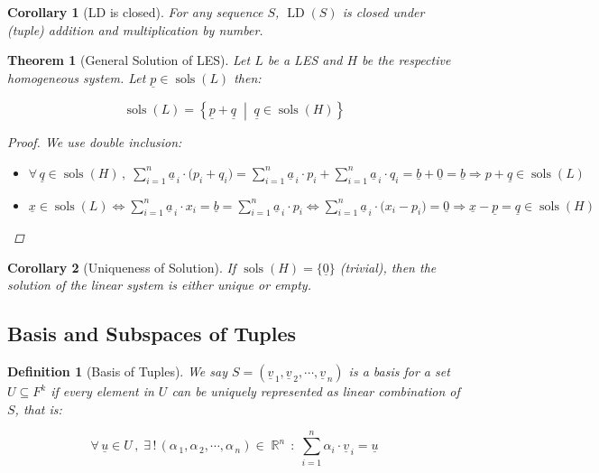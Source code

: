\documentclass[12pt]{article}
\let\RA\Rightarrow
\let\LR\Leftrightarrow
\newcommand{\set}[2]{\left\{{#1}\;\middle|\;{#2}\right\}}
\newcommand{\Forall}[1]{\forall\,{#1}\,,\;}
\newcommand{\Exist}[1]{\exists\,{#1}\,:\;}
\newcommand{\tuple}[1]{\underline{#1}}
\newcommand{\seq}[2]{\left({#1}_{\,1},{#1}_{\,2},\cdots,{#1}_{\,#2}\right)}
\newcommand{\seqt}[2]{\left(\tuple{#1}_{\,1},\tuple{#1}_{\,2},\cdots,\tuple{#1}_{\,#2}\right)}
\DeclareMathOperator{\R}{\mathbb{R}}
\DeclareMathOperator{\sols}{sols}
\DeclareMathOperator{\LD}{LD}
\newtheorem{theorem}{Theorem}[subsection]
\newtheorem{definition}{Definition}[subsection]
\newtheorem{corollary}{Corollary}[subsection]
\begin{document}
\begin{corollary}[LD is closed]
  For any sequence $S$, $\LD(S)$ is closed under (tuple) addition and multiplication by number.
\end{corollary}

\begin{theorem}[General Solution of LES]
  Let $L$ be a LES and $H$ be the respective homogeneous system. Let $\tuple{p}\in\sols(L)$ then:

  $$\sols(L)=\set{\tuple{p}+\tuple{q}}{\tuple{q}\in\sols(H)}$$

  \begin{proof}
    We use double inclusion:
    \begin{itemize}
      \item[$(\supseteq)$] $\displaystyle\Forall{\tuple{q}\in\sols(H)}\sum_{i=1}^n \tuple{a}_{\,i}\cdot \big(p_i+q_i\big)=\sum_{i=1}^n \tuple{a}_{\,i}\cdot p_i+\sum_{i=1}^n \tuple{a}_{\,i}\cdot q_i=\tuple{b}+\tuple{0}=\tuple{b}\RA  p+\tuple{q}\in\sols(L)$ 
      \item[$(\subseteq)$] $\displaystyle\tuple{x}\in\sols(L)\LR \sum_{i=1}^n \tuple{a}_{\,i}\cdot x_i=\tuple{b}=\sum_{i=1}^n \tuple{a}_{\,i}\cdot p_i\LR \sum_{i=1}^n \tuple{a}_{\,i}\cdot \big(x_i-p_i\big)=\tuple{0} \RA \tuple{x}-\tuple{p}=\tuple{q}\in\sols(H)$ 
    \end{itemize}
  \end{proof}
\end{theorem}

\begin{corollary}[Uniqueness of Solution]
  If $\sols(H)=\{\tuple{0}\}$ (trivial), then the solution of the linear system is either unique or empty.
\end{corollary}

\subsection{Basis and Subspaces of Tuples}

\begin{definition}[Basis of Tuples]
  We say $S=\seqt{v}{n}$ is a basis for a set $U\subseteq F^k$ if every element in $U$ can be uniquely represented as linear combination of $S$, that is:

  $$
  \Forall{\tuple{u}\in U}\Exist{!\,\seq{\alpha}{n}\in\R^n}\sum_{i=1}^n \alpha_i\cdot  \tuple{v}_{\,i} = \tuple{u}
  $$
\end{definition}
\end{document}
